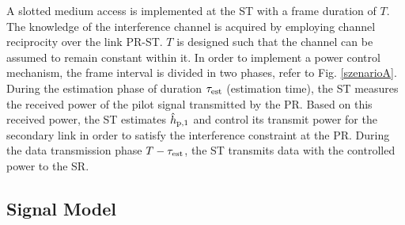 A slotted medium access is implemented at the ST with a frame duration of $T$. The knowledge of the interference channel is acquired by employing channel reciprocity over the link PR-ST. $T$ is designed such that the channel can be assumed to remain constant within it. %
In order to implement a power control mechanism, the frame interval is divided in two phases, refer to Fig. \ref{szenarioA}. During the estimation phase of duration $\tau_{\text{est}}$ (estimation time), the ST measures the received power of the pilot signal transmitted by the PR. Based on this received power, the ST estimates $\hat{h}_{\text{p,1}}$ and control its transmit power for the secondary link in order to satisfy the interference constraint at the PR. During the data transmission phase $T-\tau_{\text{est}}$, the ST transmits data with the controlled power to the SR.

\subsection{Signal Model}

